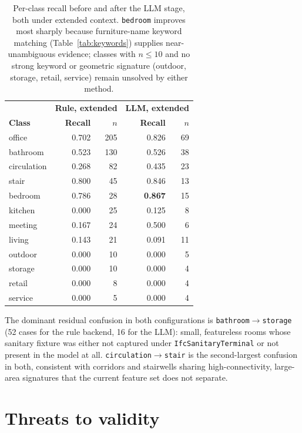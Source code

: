 \documentclass[11pt,a4paper]{article}
\begin{document}
\begin{table}[h]
\centering
\small
\begin{tabular}{@{}lrr|rr@{}}
\toprule
& \multicolumn{2}{c|}{\textbf{Rule, extended}} &
  \multicolumn{2}{c}{\textbf{LLM, extended}} \\
\textbf{Class} & \textbf{Recall} & $n$ & \textbf{Recall} & $n$ \\
\midrule
office      & 0.702 & 205 & 0.826 & 69 \\
bathroom    & 0.523 & 130 & 0.526 & 38 \\
circulation & 0.268 & 82  & 0.435 & 23 \\
stair       & 0.800 & 45  & 0.846 & 13 \\
bedroom     & 0.786 & 28  & \textbf{0.867} & 15 \\
kitchen     & 0.000 & 25  & 0.125 & 8 \\
meeting     & 0.167 & 24  & 0.500 & 6 \\
living      & 0.143 & 21  & 0.091 & 11 \\
outdoor     & 0.000 & 10  & 0.000 & 5 \\
storage     & 0.000 & 10  & 0.000 & 4 \\
retail      & 0.000 & 8   & 0.000 & 4 \\
service     & 0.000 & 5   & 0.000 & 4 \\
\bottomrule
\end{tabular}
\caption{Per-class recall before and after the LLM stage, both under extended
context. \texttt{bedroom} improves most sharply because furniture-name keyword
matching (Table~\ref{tab:keywords}) supplies near-unambiguous evidence; classes
with $n \leq 10$ and no strong keyword or geometric signature (outdoor,
storage, retail, service) remain unsolved by either method.}
\label{tab:perclass}
\end{table}

The dominant residual confusion in both configurations is
\texttt{bathroom}$\to$\texttt{storage} (52 cases for the rule backend, 16 for
the LLM): small, featureless rooms whose sanitary fixture was either not
captured under \texttt{IfcSanitaryTerminal} or not present in the model at
all. \texttt{circulation}$\to$\texttt{stair} is the second-largest confusion
in both, consistent with corridors and stairwells sharing high-connectivity,
large-area signatures that the current feature set does not separate.

\section{Threats to validity}
\label{sec:limits}
\end{document}
